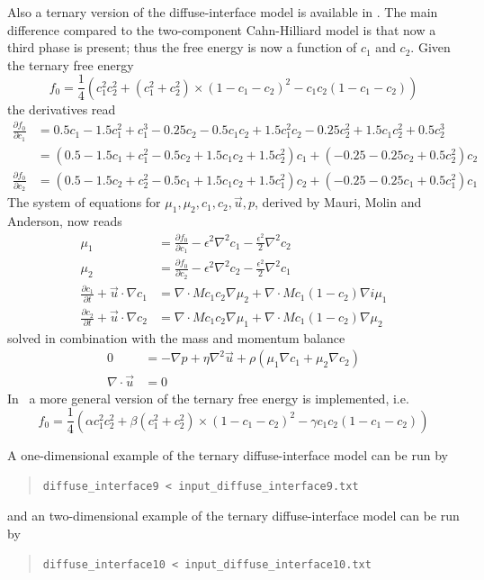 Also a ternary version of the diffuse-interface model is available in \tfem.
The main difference compared to the two-component Cahn-Hilliard model is that 
now
a third phase is present; thus the free energy is now a function of $c_1$ and 
$c_2$.
Given the ternary free energy
\begin{equation}
f_0 = \frac{1}{4} 
\left(
c_1^2 c_2^2 + (c_1^2+c_2^2)\times(1-c_1-c_2)^2 -c_1c_2 (1-c_1-c_2)
\right)
\end{equation}
the derivatives read
\begin{align*}
\frac{\partial f_0}{\partial c_1} &=
0.5c_1 
-1.5c_1^2+c_1^3-0.25c_2-0.5c_1c_2+1.5c_1^2c_2-0.25c_2^2+1.5c_1c_2^2+0.5c_2^3\\
&= ( 0.5 -1.5c_1+c_1^2 - 0.5c_2+1.5c_1c_2
+1.5c_2^2)c_1 + (-0.25 -0.25c_2 +0.5c_2^2)c_2\\
\frac{\partial f_0}{\partial c_2} &=
( 0.5 -1.5c_2+c_2^2 - 0.5c_1+1.5c_1c_2
+1.5c_1^2)c_2 + (-0.25 -0.25c_1 +0.5c_1^2)c_1
\end{align*}
The system of equations for $\mu_1,\mu_2, c_1, c_2,\vec u, p$, derived by  
Mauri, Molin and Anderson, now reads
\begin{align}
\mu_1 &= \frac{\partial f_0}{\partial c_1}-{\epsilon^2}\nabla^2 c_1 - 
\frac{\epsilon^2}{2} \nabla^2 c_2 \\
\mu_2 &= \frac{\partial f_0}{\partial c_2} -{\epsilon^2}\nabla^2 c_2 - 
\frac{\epsilon^2}{2} \nabla^2 c_1 \\
\frac{\partial c_1}{\partial t} +{\vec u} \cdot \nabla c_1 &=  \nabla  \cdot M 
c_1 c_2 \nabla \mu_2 +
 \nabla  \cdot M c_1 (1-c_2) \nabla i\mu_1\\
\frac{\partial c_2}{\partial t} +{\vec u} \cdot \nabla c_2 &=  \nabla  \cdot 
M  
c_1 c_2 \nabla \mu_1 +
 \nabla  \cdot M c_1 (1-c_2) \nabla \mu_2
\end{align}
solved in combination with the mass and momentum balance
\begin{align}
0&= -\nabla p + \eta\nabla^2 {\vec u} + \rho (\mu_1\nabla c_1 + \mu_2\nabla 
c_2)\\
\nabla \cdot {\vec u}  &=0
\end{align}
In \tfem\ a more general version of the ternary free energy is implemented, 
i.e.\
\begin{equation}
f_0 = \frac{1}{4} 
\left(
\alpha c_1^2 c_2^2 + \beta (c_1^2+c_2^2)\times(1-c_1-c_2)^2 - \gamma c_1c_2 
(1-c_1-c_2)
\right)
\end{equation}

A one-dimensional example of the ternary diffuse-interface model
can be run by
\begin{quote}
   \texttt{diffuse\_interface9 < input\_diffuse\_interface9.txt}
\end{quote}
and an two-dimensional example of the ternary diffuse-interface model
can be run by
\begin{quote}
   \texttt{diffuse\_interface10 < input\_diffuse\_interface10.txt}
\end{quote}

